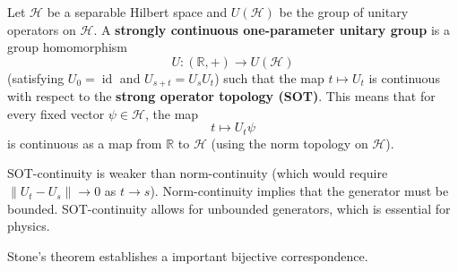 \begin{definition}
\label{def:scug}
Let $\mathcal{H}$ be a separable Hilbert space and $U(\mathcal{H})$ be the group of unitary operators on $\mathcal{H}$. A \textbf{strongly continuous one-parameter unitary group} is a group homomorphism
\begin{equation} \label{eq:4.28}
U: (\mathbb{R}, +) \longrightarrow U(\mathcal{H})
\end{equation}
(satisfying $U_0 = \operatorname{id}$ and $U_{s+t} = U_s U_t$) such that the map $t \mapsto U_t$ is continuous with respect to the \textbf{strong operator topology (SOT)}. This means that for every fixed vector $\psi \in \mathcal{H}$, the map
\[ t \mapsto U_t \psi \]
is continuous as a map from $\mathbb{R}$ to $\mathcal{H}$ (using the norm topology on $\mathcal{H}$).
\end{definition}

\begin{remark}[Topologies]
SOT-continuity is weaker than norm-continuity (which would require $\|U_t - U_s\| \to 0$ as $t \to s$). Norm-continuity implies that the generator must be bounded. SOT-continuity allows for unbounded generators, which is essential for physics.
\end{remark}

Stone's theorem establishes a important bijective correspondence.


